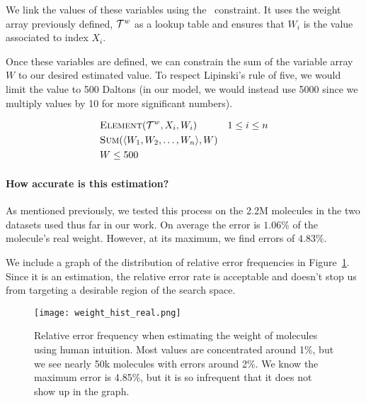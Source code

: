 \documentclass[../Document.tex]{subfiles}
\begin{document}
We link the values of these variables using the \element\ constraint. It uses the weight array previously defined, ${\cal T}^w$ as a lookup table and ensures that $W_i$ is the value associated to index $X_i$.

Once these variables are defined, we can constrain the sum of the variable array $W$ to our desired estimated value. To respect Lipinski's rule of five, we would limit the value to 500 Daltons (in our model, we would instead use 5000 since we multiply values by 10 for more significant numbers).


\begin{align*}
    &\mbox{\sc Element}({\cal T}^w, X_i, W_i)  & & 1 \leq i \leq n \\
    &\mbox{\sc Sum}(\langle W_1, W_2,\ldots,W_n \rangle, W) & & \\
    &W \leq 500  & &
\end{align*}

\paragraph{How accurate is this estimation?}
As mentioned previously, we tested this process on the 2.2M molecules in the two datasets used thus far in our work. On average the error is $1.06\%$ of the molecule's real weight. However, at its maximum, we find errors of $4.83\%$.

We include a graph of the distribution of relative error frequencies in Figure~\ref{fig:initial-weight-estimation}. Since it is an estimation, the relative error rate is acceptable and doesn't stop us from targeting a desirable region of the search space.

\begin{figure}[ht]
    \centering
    \texttt{[image: weight\_hist\_real.png]}
    \caption[Relative error frequency when estimating the weight of molecules using human intuition]{Relative error frequency when estimating the weight of molecules using human intuition. Most values are concentrated around 1\%, but we see nearly 50k molecules with errors around 2\%. We know the maximum error is 4.85\%, but it is so infrequent that it does not show up in the graph.}
    \label{fig:initial-weight-estimation}
\end{figure}

\end{document}
